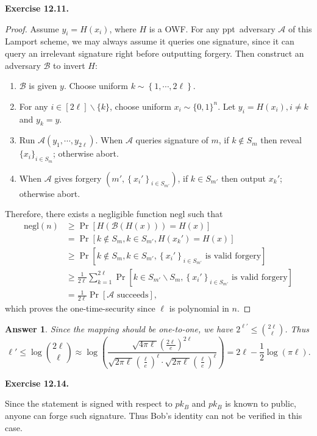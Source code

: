 \documentclass[a4paper]{article}
\newtheorem*{proof}{Proof}
\newtheorem*{answer}{Answer}
\newenvironment{exercise}[1]{
	\par
	\noindent\textbf{Exercise #1.}\quad
}{
	\par
	\bigskip
}
\newcommand{\pbra}[1]{\left( #1 \right)}
\newcommand{\cbra}[1]{\left\{ #1 \right\}}
\newcommand{\sbra}[1]{\left[ #1 \right]}
\newcommand{\bin}{\{0,1\}}
\newcommand{\negl}{\mathrm{negl}}
\newcommand{\ppt}{{\sc ppt}~}
\newcommand{\Acal}{\mathcal{A}}
\newcommand{\Bcal}{\mathcal{B}}
\begin{document}
\begin{exercise}{12.11}
\begin{proof} 
    Assume $y_i=H(x_i)$, where $H$ is a OWF.
    For any \ppt adversary $\Acal$ of this Lamport scheme, we may always assume it queries one signature, since
    it can query an irrelevant signature right before outputting forgery.
    Then construct an adversary $\Bcal$ to invert $H$:
    \begin{enumerate}
        \item $\Bcal$ is given $y$. Choose uniform $k\sim\cbra{1,\cdots,2\ell}$.
        \item For any $i\in[2\ell]\backslash\{k\}$, choose uniform $x_i\sim\bin^n$.
            Let $y_i=H(x_i),i\neq k$ and $y_k=y$.
        \item Run $\Acal(y_1,\cdots,y_{2\ell})$. When $\Acal$ queries signature of $m$, if $k\notin S_m$ then
            reveal $\{x_i\}_{i\in S_m}$; otherwise abort.
        \item When $\Acal$ gives forgery $(m',\cbra{x_i'}_{i\in S_{m'}})$, if $k\in S_{m'}$ then output $x_k'$;
            otherwise abort.
    \end{enumerate}
    Therefore, there exists a negligible function $\negl$ such that
    \begin{align*}
        \negl(n)&\geq\Pr\sbra{H(\Bcal(H(x)))=H(x)}\\
        &=\Pr\sbra{k\notin S_m,k\in S_{m'},H(x_k')=H(x)}\\
        &\geq\Pr\sbra{k\notin S_m,k\in S_{m'},\cbra{x_i'}_{i\in S_{m'}}\text{ is valid forgery}}\\
        &\geq\frac1{2\ell}\sum_{k=1}^{2\ell}
            \Pr\sbra{k\in S_{m'}\backslash S_m,\cbra{x_i'}_{i\in S_{m'}}\text{ is valid forgery}}\\
        &=\frac1{2\ell}\Pr\sbra{\Acal\text{ succeeds}},
    \end{align*}
    which proves the one-time-security since $\ell$ is polynomial in $n$.
\end{proof}
\begin{answer}
    Since the mapping should be one-to-one, we have $2^{\ell'}\leq\binom{2\ell}{\ell}$.
    Thus 
    $$
    \ell'\leq\log\binom{2\ell}{\ell}\approx
    \log\pbra{\frac{\sqrt{4\pi\ell}\pbra{\frac{2\ell}{e}}^{2\ell}}
    {\sqrt{2\pi\ell}\pbra{\frac{\ell}{e}}^\ell\cdot\sqrt{2\pi\ell}\pbra{\frac{\ell}{e}}^\ell}}
    =2\ell-\frac12\log\pbra{\pi\ell}.
    $$
\end{answer}
\end{exercise}

\begin{exercise}{12.14}
    Since the statement is signed with respect to $pk_B$ and $pk_B$ is known to public, 
    anyone can forge such signature. Thus Bob's identity can not be verified in this case.
\end{exercise}
\end{document}
